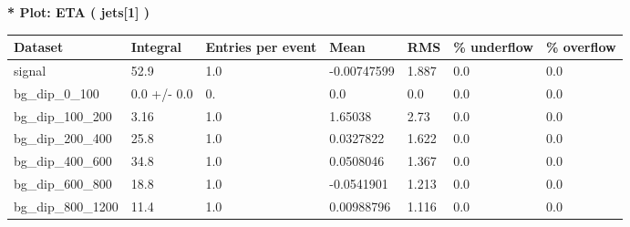 \documentclass[a4paper, 10pt]{article}
\begin{document}
\textbf{* Plot: ETA ( jets[1] ) }\\
   \begin{table}[H]
  \begin{center}
    \begin{tabular}{|m{23.0mm}|m{23.0mm}|m{18.0mm}|m{19.0mm}|m{19.0mm}|m{19.0mm}|m{19.0mm}|}
      \hline
      {\cellcolor{yellow}         Dataset}& {\cellcolor{yellow}         Integral}& {\cellcolor{yellow}         Entries per event}& {\cellcolor{yellow}         Mean}& {\cellcolor{yellow}         RMS}& {\cellcolor{yellow}         \% underflow}& {\cellcolor{yellow}         \% overflow}\\
      \hline
      {\cellcolor{white}         signal}& {\cellcolor{white}         52.9}& {\cellcolor{white}         1.0}& {\cellcolor{white}         -0.00747599}& {\cellcolor{white}         1.887}& {\cellcolor{green}         0.0}& {\cellcolor{green}         0.0}\\
      \hline
      {\cellcolor{white}         bg\_dip\_0\_100}& {\cellcolor{white}         0.0 +/\-- 0.0}& {\cellcolor{white}         0.}& {\cellcolor{white}         0.0}& {\cellcolor{white}         0.0}& {\cellcolor{green}         0.0}& {\cellcolor{green}         0.0}\\
      \hline
      {\cellcolor{white}         bg\_dip\_100\_200}& {\cellcolor{white}         3.16}& {\cellcolor{white}         1.0}& {\cellcolor{white}         1.65038}& {\cellcolor{white}         2.73}& {\cellcolor{green}         0.0}& {\cellcolor{green}         0.0}\\
      \hline
      {\cellcolor{white}         bg\_dip\_200\_400}& {\cellcolor{white}         25.8}& {\cellcolor{white}         1.0}& {\cellcolor{white}         0.0327822}& {\cellcolor{white}         1.622}& {\cellcolor{green}         0.0}& {\cellcolor{green}         0.0}\\
      \hline
      {\cellcolor{white}         bg\_dip\_400\_600}& {\cellcolor{white}         34.8}& {\cellcolor{white}         1.0}& {\cellcolor{white}         0.0508046}& {\cellcolor{white}         1.367}& {\cellcolor{green}         0.0}& {\cellcolor{green}         0.0}\\
      \hline
      {\cellcolor{white}         bg\_dip\_600\_800}& {\cellcolor{white}         18.8}& {\cellcolor{white}         1.0}& {\cellcolor{white}         -0.0541901}& {\cellcolor{white}         1.213}& {\cellcolor{green}         0.0}& {\cellcolor{green}         0.0}\\
      \hline
      {\cellcolor{white}         bg\_dip\_800\_1200}& {\cellcolor{white}         11.4}& {\cellcolor{white}         1.0}& {\cellcolor{white}         0.00988796}& {\cellcolor{white}         1.116}& {\cellcolor{green}         0.0}& {\cellcolor{green}         0.0}\\

\end{tabular}
\end{center}
\end{table}
\end{document}
